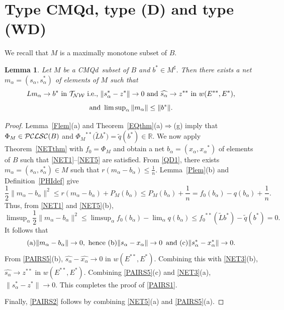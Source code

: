 \documentclass[letterpaper]{article}
\theoremstyle{plain}
\newtheorem{lemma}[theorem]{Lemma}
\theoremstyle{definition}
\numberwithin{equation}{section}
\newcommand{\cmqd}{{CMQd}}
\newcommand{\dbs}{^{**}}
\newcommand{\half}{{\textstyle\frac{1}{2}}}
\newcommand{\limn}{\lim\nolimits}
\newcommand{\limsupn}{\limsup\nolimits}
\newcommand{\lr}{\Longrightarrow}
\newcommand{\Lt}{{\wt L}}
\newcommand{\nth}{{\textstyle\frac{1}{n}}}
\newcommand{\PCLSC}{{\cal PCLSC}}
\newcommand{\qt}{\wt q}
\newcommand{\RR}{\mathbb R}
\newcommand{\TNW}{\cal{T_{NW}}}
\newcommand{\wh}{\widehat}
\newcommand{\wt}{\widetilde}
\newcommand{\Def}{Definition~\ref}
\newcommand{\Lem}{Lemma~\ref}
\newcommand{\Thm}{Theorem~\ref}
\begin{document}
\section{Type \cmqd, type (D) and type (WD)}\label{Dsec}
We recall that $M$ is a maximally monotone subset of $B$.
\begin{lemma}\label{PAIRSlem}
Let $M$ be a \cmqd\ subset of $B$ and $b^* \in M^\sharp$.   Then there exists a net $m_\alpha= (s_\alpha,s_\alpha^*)$ of elements of $M$ such that
\begin{equation}\label{PAIRS1}
Lm_\alpha \to b^*\hbox{ in }{\TNW}\hbox{ i.e., }\|s_\alpha^* - z^*\| \to 0\hbox{ and }\wh{s_\alpha} \to z\dbs\hbox{ in }w(E\dbs,E^*),
\end{equation}
\begin{equation}\label{PAIRS2}
\hbox{and }\limsupn_\alpha \|m_\alpha\| \le \|b^*\|.
\end{equation}
\end{lemma}
%
\begin{proof}
%
\Lem{Flem}(a) and \Thm{EQthm}(a)$\lr$(g) imply that $\Phi_M \in \PCLSC(B)$ and ${\Phi_M}\dbs\big(\Lt b^*\big) = \qt(b^*) \in \RR$.   We now apply \Thm{NETthm} with $f_0 = \Phi_M$ and obtain a net $b_\alpha = (x_\alpha,{x_\alpha}^*)$ of elements of $B$ such that \eqref{NET1}--\eqref{NET5} are satisfied.   From \eqref{QD1}, there exists $m_\alpha = (s_\alpha,s_\alpha^*) \in M$ such that $r(m_\alpha - b_\alpha) \le \nth$.   \Lem{Plem}(b) and \Def{PHIdef} give
%
$$\half\|m_\alpha - b_\alpha\|^2 \le r(m_\alpha - b_\alpha) + P_M(b_\alpha) \le P_M(b_\alpha) + \nth = f_0(b_\alpha) - q(b_\alpha) + \nth.$$
%
Thus, from  \eqref{NET1} and \eqref{NET5}(b),
\begin{equation*}%
\limsupn_\alpha \half\|m_\alpha - b_\alpha\|^2 \le \limsupn_\alpha f_0(b_\alpha) -  \limn_\alpha q(b_\alpha) \le {f_0}\dbs(\Lt b^*) - \qt(b^*) = 0.
\end{equation*}
%
It follows that  
\begin{equation}\label{PAIRS5}
\hbox{(a)}\|m_\alpha - b_\alpha\| \to 0,\hbox{ hence (b)} \|s_\alpha - x_\alpha\| \to 0\,\hbox{ and (c)} \|s_\alpha^* - x_\alpha^*\| \to 0.
\end{equation}
%
From \eqref{PAIRS5}(b),  $\wh{s_\alpha} -  \wh{x_\alpha} \to 0$ in $w(E\dbs,E^*)$.   Combining this with \eqref{NET3}(b),\break $\wh{s_\alpha} \to z\dbs$ in $w(E\dbs,E^*)$.   Combining \eqref{PAIRS5}(c) and \eqref{NET3}(a), $\|s_\alpha^* - z^*\| \to 0$.   This completes the proof of \eqref{PAIRS1}.   
\par
Finally, \eqref{PAIRS2} follows by combining \eqref{NET5}(a) and \eqref{PAIRS5}(a).
\end{proof}
\end{document}
